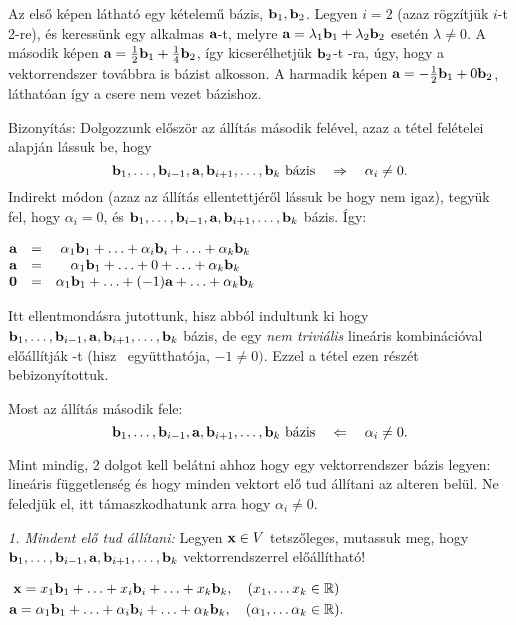 \documentclass[a4paper,11.5pt]{article}
\begin{document}
	{\centering Az első képen látható egy kételemű bázis, $\textbf{b}_1,\textbf{b}_2$. Legyen $i=2$ (azaz rögzítjük $i$-t 2-re), és keressünk egy alkalmas $\textbf{a}$-t, melyre $\textbf{a}=\lambda_1\textbf{b}_1+\lambda_2\textbf{b}_2$ esetén $\lambda \not=0$. A második képen $\textbf{a}=\frac{1}{2}\textbf{b}_1+\frac{1}{4}\textbf{b}_2$, így kicserélhetjük $\textbf{b}_2$-t \a-ra, úgy, hogy a vektorrendszer továbbra is bázist alkosson. A harmadik képen $\textbf{a}=-\frac{1}{2}\textbf{b}_1+0\textbf{b}_2$, láthatóan így a csere nem vezet bázishoz. \par}	
	
	Bizonyítás: Dolgozzunk először az állítás második felével, azaz a tétel felételei alapján lássuk be, hogy \[\textbf{b}_1,\ldots,\textbf{b}_{i-1},\textbf{a},\textbf{b}_{i+1},\ldots,\textbf{b}_k \text{ bázis} \quad\Rightarrow \quad \alpha_i\not=0.\]
	Indirekt módon (azaz az állítás ellentettjéről lássuk be hogy nem igaz), tegyük fel, hogy $\alpha_i=0$, és $\textbf{b}_1,\ldots,\textbf{b}_{i-1},\textbf{a},\textbf{b}_{i+1},\ldots,\textbf{b}_k$ bázis. Így:
	
	\begin{center}
		$\begin{matrix}
			\textbf{a}&=&\alpha_1\textbf{b}_1+\ldots+\alpha_i\textbf{b}_i+\ldots+\alpha_k\textbf{b}_k\\
			\textbf{a}&=&\alpha_1\textbf{b}_1+\ldots+0+\ldots+\alpha_k\textbf{b}_k\\
			\textbf{0}&=&\alpha_1\textbf{b}_1+\ldots+(-1)\textbf{a}+\ldots+\alpha_k\textbf{b}_k
		\end{matrix}$
	\end{center}
	
	Itt ellentmondásra jutottunk, hisz abból indultunk ki hogy $\textbf{b}_1,\ldots,\textbf{b}_{i-1},\textbf{a},\textbf{b}_{i+1},\ldots,\textbf{b}_k$ bázis, de egy \emph{nem triviális} lineáris kombinációval előállítják \0-t (hisz \a\  együtthatója, $-1\not=0)$. Ezzel a tétel ezen részét bebizonyítottuk.
	
	\medskip
	Most az állítás második fele:
	\[\textbf{b}_1,\ldots,\textbf{b}_{i-1},\textbf{a},\textbf{b}_{i+1},\ldots,\textbf{b}_k \text{ bázis} \quad\Leftarrow \quad \alpha_i\not=0.\]
	
	Mint mindig, 2 dolgot kell belátni ahhoz hogy egy vektorrendszer bázis legyen: lineáris függetlenség és hogy minden vektort elő tud állítani az alteren belül. Ne feledjük el, itt támaszkodhatunk arra hogy $\alpha_i\not=0$.
	
	\smallskip
	\emph{1. Mindent elő tud állítani:} Legyen $\textbf{x} \in V$ tetszőleges, mutassuk meg, hogy $\textbf{b}_1,\ldots,\textbf{b}_{i-1},\textbf{a},\textbf{b}_{i+1},\ldots,\textbf{b}_k$ vektorrendszerrel előállítható!
	
	\begin{center}
		$\begin{gathered}
			\textbf{x}=x_1\textbf{b}_1+\ldots+x_i\textbf{b}_i+\ldots+ x_k\textbf{b}_k,\quad (x_1,\ldots x_k\in\mathbb{R})\\
			\textbf{a} = \alpha_1\textbf{b}_1+\ldots+\alpha_i\textbf{b}_i+\ldots+\alpha_k\textbf{b}_k,\quad (\alpha_1,\ldots\alpha_k\in\mathbb{R}).\\
		\end{gathered}$
	\end{center}
	
\end{document}
